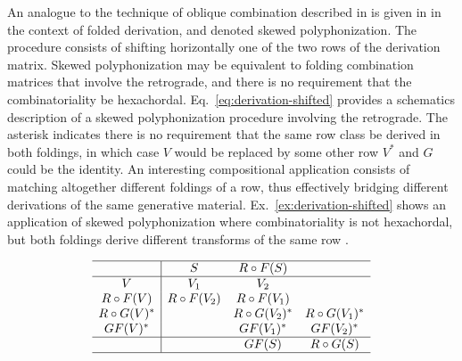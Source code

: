 An analogue to the technique of oblique combination described in \cite[241, 267]{Martino1961} is given in \cite{Starr1984} in the context of folded derivation, and denoted skewed polyphonization. The procedure consists of shifting horizontally one of the two rows of the derivation matrix. Skewed polyphonization may be equivalent to folding combination matrices that involve the retrograde, and there is no requirement that the combinatoriality be hexachordal. Eq.~\ref{eq:derivation-shifted} provides a schematics description of a skewed polyphonization procedure involving the retrograde. The asterisk indicates there is no requirement that the same row class be derived in both foldings, in which case $V$ would be replaced by some other row $V^*$ and $G$ could be the identity. An interesting compositional application consists of matching altogether different foldings of a row, thus effectively bridging different derivations of the same generative material. Ex.~\ref{ex:derivation-shifted} shows an application of skewed polyphonization where combinatoriality is not hexachordal, but both foldings derive different transforms of the same row \cite[216]{Starr1984}.

\begin{equation}
\begin{array}{c|ccc}
	\hline
    & S & R \circ F(S) & \\
    \hline
    V & V_1 & V_2 & \\
    R \circ F(V) & R \circ F(V_2) & R \circ F(V_1) & \\
    R \circ G(V)^* && R \circ G(V_2)^* & R \circ G(V_1)^* \\
    GF(V)^* && GF(V_1)^* & GF(V_2)^* \\
    \hline
    && GF(S) & R \circ G(S) \\
    \hline
\end{array}
\label{eq:derivation-shifted}
\end{equation}

\vspace{12pt}

